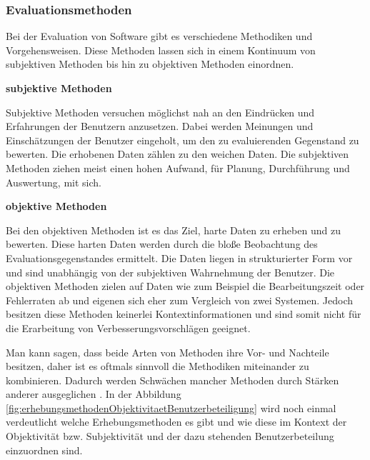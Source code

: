 \subsubsection{Evaluationsmethoden}
Bei der Evaluation von Software gibt es verschiedene Methodiken und Vorgehensweisen. Diese Methoden lassen sich in einem Kontinuum von subjektiven Methoden bis hin zu objektiven Methoden einordnen. 

\textbf{subjektive Methoden}

Subjektive Methoden versuchen möglichst nah an den Eindrücken und Erfahrungen der Benutzern anzusetzen. Dabei werden Meinungen und Einschätzungen der Benutzer eingeholt, um den zu evaluierenden Gegenstand zu bewerten. Die erhobenen Daten zählen zu den \glqq weichen \grqq{} Daten. Die subjektiven Methoden ziehen meist einen hohen Aufwand, für Planung, Durchführung und Auswertung, mit sich. 

\textbf{objektive Methoden}

Bei den objektiven Methoden ist es das Ziel, \glqq harte \grqq{} Daten zu erheben und zu bewerten. Diese harten Daten werden durch die bloße Beobachtung des Evaluationsgegenstandes ermittelt. Die Daten liegen in strukturierter Form vor und sind unabhängig von der subjektiven Wahrnehmung der Benutzer. Die objektiven Methoden zielen auf Daten wie zum Beispiel die Bearbeitungszeit oder Fehlerraten ab und eigenen sich eher zum Vergleich von zwei Systemen. Jedoch besitzen diese Methoden keinerlei Kontextinformationen und sind somit nicht für die Erarbeitung von Verbesserungsvorschlägen geeignet.

Man kann sagen, dass beide Arten von Methoden ihre Vor- und Nachteile besitzen, daher ist es oftmals sinnvoll die Methodiken miteinander zu kombinieren. Dadurch werden Schwächen mancher Methoden durch Stärken anderer ausgeglichen \citep[][]{Hegner2003}. In der Abbildung \ref{fig:erhebungsmethodenObjektivitaetBenutzerbeteiligung} wird noch einmal verdeutlicht welche Erhebungsmethoden es gibt und wie diese im Kontext der Objektivität bzw. Subjektivität und der dazu stehenden Benutzerbeteilung einzuordnen sind.

